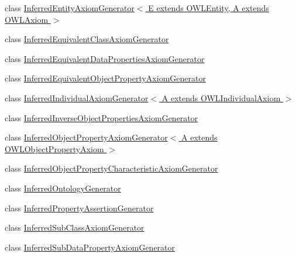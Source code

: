 \begin{DoxyCompactItemize}
\item 
class \hyperlink{classorg_1_1semanticweb_1_1owlapi_1_1util_1_1_inferred_entity_axiom_generator_3_01_e_01extends_0ddbb3a27179f13f242fcbe2b6c7938c1}{Inferred\-Entity\-Axiom\-Generator$<$ E extends O\-W\-L\-Entity, A extends O\-W\-L\-Axiom $>$}
\item 
class \hyperlink{classorg_1_1semanticweb_1_1owlapi_1_1util_1_1_inferred_equivalent_class_axiom_generator}{Inferred\-Equivalent\-Class\-Axiom\-Generator}
\item 
class \hyperlink{classorg_1_1semanticweb_1_1owlapi_1_1util_1_1_inferred_equivalent_data_properties_axiom_generator}{Inferred\-Equivalent\-Data\-Properties\-Axiom\-Generator}
\item 
class \hyperlink{classorg_1_1semanticweb_1_1owlapi_1_1util_1_1_inferred_equivalent_object_property_axiom_generator}{Inferred\-Equivalent\-Object\-Property\-Axiom\-Generator}
\item 
class \hyperlink{classorg_1_1semanticweb_1_1owlapi_1_1util_1_1_inferred_individual_axiom_generator_3_01_a_01exten2bffc9bdb7d503a66dc382eefad30b9e}{Inferred\-Individual\-Axiom\-Generator$<$ A extends O\-W\-L\-Individual\-Axiom $>$}
\item 
class \hyperlink{classorg_1_1semanticweb_1_1owlapi_1_1util_1_1_inferred_inverse_object_properties_axiom_generator}{Inferred\-Inverse\-Object\-Properties\-Axiom\-Generator}
\item 
class \hyperlink{classorg_1_1semanticweb_1_1owlapi_1_1util_1_1_inferred_object_property_axiom_generator_3_01_a_0157202feb469e51c0b6b6c48d3f58d40c}{Inferred\-Object\-Property\-Axiom\-Generator$<$ A extends O\-W\-L\-Object\-Property\-Axiom $>$}
\item 
class \hyperlink{classorg_1_1semanticweb_1_1owlapi_1_1util_1_1_inferred_object_property_characteristic_axiom_generator}{Inferred\-Object\-Property\-Characteristic\-Axiom\-Generator}
\item 
class \hyperlink{classorg_1_1semanticweb_1_1owlapi_1_1util_1_1_inferred_ontology_generator}{Inferred\-Ontology\-Generator}
\item 
class \hyperlink{classorg_1_1semanticweb_1_1owlapi_1_1util_1_1_inferred_property_assertion_generator}{Inferred\-Property\-Assertion\-Generator}
\item 
class \hyperlink{classorg_1_1semanticweb_1_1owlapi_1_1util_1_1_inferred_sub_class_axiom_generator}{Inferred\-Sub\-Class\-Axiom\-Generator}
\item 
class \hyperlink{classorg_1_1semanticweb_1_1owlapi_1_1util_1_1_inferred_sub_data_property_axiom_generator}{Inferred\-Sub\-Data\-Property\-Axiom\-Generator}

\end{DoxyCompactItemize}
